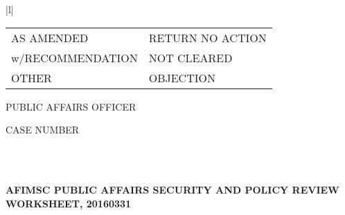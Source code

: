 \documentclass{article}
\begin{document}
{\begin{tabular}{|l|}
{\begin{tabular}{ll}
\radioButton{10a}{10bp}{10bp}{yes}\hspace{2pt} \scriptsize AS AMENDED &
\radioButton{10a}{10bp}{10bp}{no} \hspace{2pt} \scriptsize RETURN NO ACTION\\[4pt]

\radioButton{10a}{10bp}{10bp}{yes}\hspace{2pt} \scriptsize w/RECOMMENDATION &
\radioButton{10a}{10bp}{10bp}{no} \hspace{2pt} \scriptsize NOT CLEARED\\[4pt]

\radioButton{10a}{10bp}{10bp}{yes}\hspace{2pt} \scriptsize OTHER &
\radioButton{10a}{10bp}{10bp}{no} \hspace{2pt} \scriptsize OBJECTION

\end{tabular}
} \vrule \hspace{1pt}

\parbox[][\rhXIII][c]{0.4\textwidth}{
\vspace{1pt}
\small PUBLIC AFFAIRS OFFICER\\[4pt]
}\vrule \hspace{1pt}

\parbox[][\rhXIII][t]{0.2\textwidth}{
\vspace{2pt}
\small CASE NUMBER\\[4pt]
}\\
\hline

\end{tabular}
}\\[2pt]
\textbf{AFIMSC PUBLIC AFFAIRS SECURITY AND POLICY REVIEW WORKSHEET, 20160331}

\newpage
\end{document}
